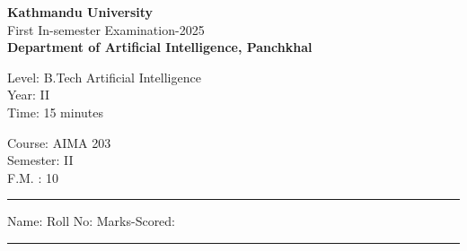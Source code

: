 \documentclass[12pt]{exam}
\begin{document}
\begin{center}
  {\bfseries  {\large Kathmandu University}} \\
  First In-semester Examination-2025 \\[-2mm]
    \textbf{\small Department of Artificial Intelligence, Panchkhal}
\end{center}
\vspace{2mm}

\begin{minipage}{0.70\linewidth}
  \begin{flushleft}
    Level: B.Tech Artificial Intelligence \\
    Year: II \\
    Time: 15 minutes
  \end{flushleft}
\end{minipage} \hfill
\begin{minipage}{0.25\linewidth}
  \begin{flushleft}
    Course: AIMA 203 \\
    Semester: II \\
    F.M. : 10
  \end{flushleft}
\end{minipage}
\vspace{-8mm}
\begin{center}
  \rule{\textwidth}{1pt}
  Name: \hspace{5cm}  Roll No: \hspace{3cm} Marks-Scored:
  \vskip -3mm
\rule{\textwidth}{1pt}
\end{center}
\end{document}
